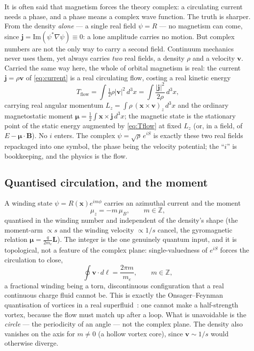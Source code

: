 \documentclass[11pt]{article}
\begin{document}
It is often said that magnetism forces the theory complex: a circulating current needs a phase, and a phase means
a complex wave function. The truth is sharper. From the density \emph{alone} --- a single real field $\psi=R$ ---
no magnetism can come, since $\mathbf j=\mathrm{Im}(\psi^*\nabla\psi)\equiv0$: a lone amplitude carries no motion.
But complex numbers are not the only way to carry a second field. Continuum mechanics never uses them, yet always
carries \emph{two} real fields, a density $\rho$ and a velocity $\mathbf v$. Carried the same way here, the whole
of orbital magnetism is real: the current $\mathbf j=\rho\mathbf v$ of \eqref{eq:current} is a real circulating
flow, costing a real kinetic energy
\begin{equation}
T_{\text{flow}}=\int\tfrac12\rho|\mathbf v|^2\,d^3x=\int\frac{|\mathbf j|^2}{2\rho}\,d^3x,
\label{eq:Tflow}
\end{equation}
carrying real angular momentum $L_z=\int\rho\,(\mathbf x\times\mathbf v)_z\,d^3x$ and the ordinary magnetostatic
moment $\boldsymbol\mu=\tfrac12\int\mathbf x\times\mathbf j\,d^3x$; the magnetic state is the stationary point of
the static energy augmented by \eqref{eq:Tflow} at fixed $L_z$ (or, in a field, of $E-\boldsymbol\mu\!\cdot\!
\mathbf B$). No $i$ enters. The complex $\psi=\sqrt\rho\,e^{iS}$ is exactly these two real fields repackaged into
one symbol, the phase being the velocity potential; the ``$i$'' is bookkeeping, and the physics is the flow.

\subsection{Quantised circulation, and the moment}

A winding state $\psi=R(\mathbf x)e^{im\phi}$ carries an azimuthal current and the moment
\begin{equation}
\mu_z=-m\,\mu_B,\qquad m\in\mathbb Z,
\label{eq:mu}
\end{equation}
quantised in the winding number and independent of the density's shape (the moment-arm $\propto s$ and the winding
velocity $\propto 1/s$ cancel, the gyromagnetic relation $\boldsymbol\mu=\tfrac{q}{2m_e}\mathbf L$). The integer
is the one genuinely quantum input, and it is topological, not a feature of the complex plane: single-valuedness
of $e^{iS}$ forces the circulation to close,
\begin{equation}
\oint\mathbf v\cdot d\boldsymbol\ell = \frac{2\pi m}{m_e},\qquad m\in\mathbb Z,
\label{eq:circ}
\end{equation}
a fractional winding being a torn, discontinuous configuration that a real continuous charge fluid cannot be.
This is exactly the Onsager--Feynman quantisation of vortices in a real superfluid~\cite{Onsager,Feynman}: one
cannot make a half-strength vortex, because the flow must match up after a loop. What is unavoidable is the
\emph{circle} --- the periodicity of an angle --- not the complex plane. The density also vanishes on the axis for
$m\neq0$ (a hollow vortex core), since $\mathbf v\sim1/s$ would otherwise diverge.
\end{document}
